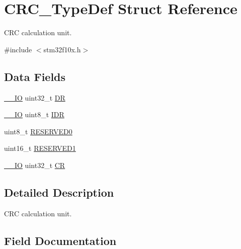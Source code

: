 \hypertarget{struct_c_r_c___type_def}{}\section{C\+R\+C\+\_\+\+Type\+Def Struct Reference}
\label{struct_c_r_c___type_def}


C\+RC calculation unit.  




{\ttfamily \#include $<$stm32f10x.\+h$>$}

\subsection*{Data Fields}
\begin{DoxyCompactItemize}
\item 
\mbox{\hyperlink{core__sc300_8h_aec43007d9998a0a0e01faede4133d6be}{\+\_\+\+\_\+\+IO}} uint32\+\_\+t \mbox{\hyperlink{struct_c_r_c___type_def_a3df0d8dfcd1ec958659ffe21eb64fa94}{DR}}
\item 
\mbox{\hyperlink{core__sc300_8h_aec43007d9998a0a0e01faede4133d6be}{\+\_\+\+\_\+\+IO}} uint8\+\_\+t \mbox{\hyperlink{struct_c_r_c___type_def_a601d7b0ba761c987db359b2d7173b7e0}{I\+DR}}
\item 
uint8\+\_\+t \mbox{\hyperlink{struct_c_r_c___type_def_aa7d2bd5481ee985778c410a7e5826b71}{R\+E\+S\+E\+R\+V\+E\+D0}}
\item 
uint16\+\_\+t \mbox{\hyperlink{struct_c_r_c___type_def_a8249a3955aace28d92109b391311eb30}{R\+E\+S\+E\+R\+V\+E\+D1}}
\item 
\mbox{\hyperlink{core__sc300_8h_aec43007d9998a0a0e01faede4133d6be}{\+\_\+\+\_\+\+IO}} uint32\+\_\+t \mbox{\hyperlink{struct_c_r_c___type_def_ab40c89c59391aaa9d9a8ec011dd0907a}{CR}}
\end{DoxyCompactItemize}


\subsection{Detailed Description}
C\+RC calculation unit. 

\subsection{Field Documentation}
\mbox{\label{struct_c_r_c___type_def_ab40c89c59391aaa9d9a8ec011dd0907a}} 
